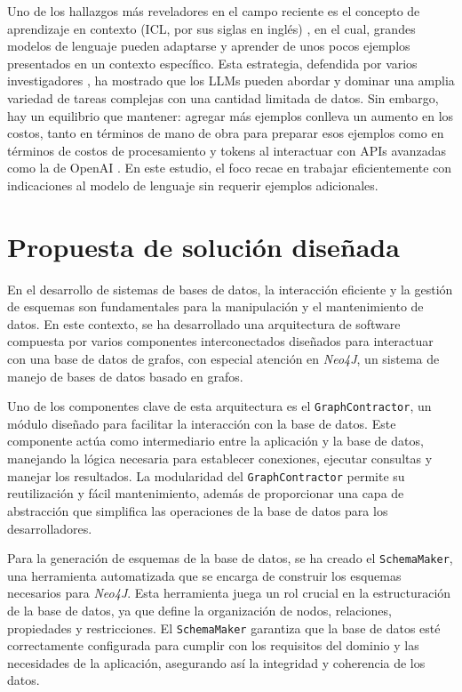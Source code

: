 Uno de los hallazgos más reveladores en el campo reciente es el concepto de aprendizaje en contexto (ICL, por sus siglas en inglés) \cite{icldefinition}, en el cual, grandes modelos de lenguaje pueden adaptarse y aprender de unos pocos ejemplos presentados en un contexto específico. Esta estrategia, defendida por varios investigadores \cite{sunetal2023} \cite{minetal2022} \cite{pourrezandrafiei2023}, ha mostrado que los LLMs pueden abordar y dominar una amplia variedad de tareas complejas con una cantidad limitada de datos. Sin embargo, hay un equilibrio que mantener: agregar más ejemplos conlleva un aumento en los costos, tanto en términos de mano de obra para preparar esos ejemplos como en términos de costos de procesamiento y tokens al interactuar con APIs avanzadas como la de OpenAI \cite{openaiapi}. En este estudio, el foco recae en trabajar eficientemente con indicaciones al modelo de lenguaje sin requerir ejemplos adicionales.

\section{Propuesta de solución diseñada} \label{designed_proposal}

En el desarrollo de sistemas de bases de datos, la interacción eficiente y la gestión de esquemas son fundamentales para la manipulación y el mantenimiento de datos. En este contexto, se ha desarrollado una arquitectura de software compuesta por varios componentes interconectados diseñados para interactuar con una base de datos de grafos, con especial atención en \textit{Neo4J}, un sistema de manejo de bases de datos basado en grafos.

Uno de los componentes clave de esta arquitectura es el \texttt{GraphContractor}, un módulo diseñado para facilitar la interacción con la base de datos. Este componente actúa como intermediario entre la aplicación y la base de datos, manejando la lógica necesaria para establecer conexiones, ejecutar consultas y manejar los resultados. La modularidad del \texttt{GraphContractor} permite su reutilización y fácil mantenimiento, además de proporcionar una capa de abstracción que simplifica las operaciones de la base de datos para los desarrolladores.

Para la generación de esquemas de la base de datos, se ha creado el \texttt{SchemaMaker}, una herramienta automatizada que se encarga de construir los esquemas necesarios para \textit{Neo4J}. Esta herramienta juega un rol crucial en la estructuración de la base de datos, ya que define la organización de nodos, relaciones, propiedades y restricciones. El \texttt{SchemaMaker} garantiza que la base de datos esté correctamente configurada para cumplir con los requisitos del dominio y las necesidades de la aplicación, asegurando así la integridad y coherencia de los datos.

